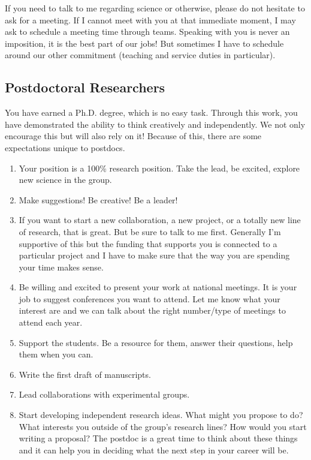 \documentclass[letterpaper]{article}
\begin{document}
If you need to talk to me regarding science or otherwise, please do not hesitate to ask for a meeting. If I cannot meet with you at that immediate moment, I may ask to schedule a meeting time through teams. Speaking with you is never an imposition, it is the best part of our jobs! But sometimes I have to schedule around our other commitment (teaching and service duties in particular).

\subsection*{Postdoctoral Researchers}
You have earned a Ph.D. degree, which is no easy task. Through this work, you have demonstrated the ability to think creatively and independently. We not only encourage this but will also rely on it! Because of this, there are some expectations unique to postdocs. 

\begin{enumerate} 
\item Your position is a 100\% research position. Take the lead, be excited, explore new science in the group.
\item Make suggestions! Be creative! Be a leader!
\item If you want to start a new collaboration, a new project, or a totally new line of research, that is great. But be sure to talk to me first. Generally I'm supportive of this but the funding that supports you is connected to a particular project and I have to make sure that the way you are spending your time makes sense.
\item Be willing and excited to present your work at national meetings. It is your job to suggest conferences you want to attend. Let me know what your interest are and we can talk about the right number/type of meetings to attend each year.
\item Support the students. Be a resource for them, answer their questions, help them when you can.
\item Write the first draft of manuscripts.
\item Lead collaborations with experimental groups.
\item Start developing independent research ideas. What might you propose to do? What interests you outside of the group's research lines? How would you start writing a proposal? The postdoc is a great time to think about these things and it can help you in deciding what the next step in your career will be. 
\end{enumerate}
\end{document}

